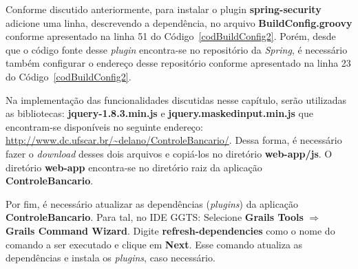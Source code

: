Conforme discutido  anteriormente, para instalar o  plugin {\bf spring-security}
adicione   uma    linha,   descrevendo   a   dependência,    no   arquivo   {\bf
  BuildConfig.groovy}     conforme     apresentado     na    linha     51     do
Código~\ref{codBuildConfig2}.   Porém,  desde  que  o código  fonte  desse  {\it
  plugin}  encontra-se  no repositório  da  {\it  Spring},  é necessário  também
configurar  o endereço  desse repositório  conforme apresentado  na linha  23 do
Código~\ref{codBuildConfig2}.  

\vspace{0.5cm}

   Na implementação das
funcionalidades discutidas nesse capítulo, serão utilizadas as bibliotecas: {\bf
  jquery-1.8.3.min.js}   e  {\bf  jquery.maskedinput.min.js}   que  encontram-se
disponíveis                 no                 seguinte                endereço:
{\footnotesize\url{http://www.dc.ufscar.br/~delano/ControleBancario/}}.     Dessa
forma, é necessário  fazer o {\it download} desses dois  arquivos e copiá-los no
diretório {\bf web-app/js}.  O  diretório {\bf web-app} encontra-se no diretório
raiz da aplicação {\bf ControleBancario}. 

\vspace{0.5cm}

   Por  fim,  é  necessário
atualizar as  dependências ({\it plugins}) da  aplicação {\bf ControleBancario}.
Para  tal, no  IDE GGTS:  Selecione  {\bf Grails  Tools} $\Longrightarrow$  {\bf
  Grails  Command Wizard}.   Digite {\bf  refresh-dependencies} como  o  nome do
comando  a ser  executado e  clique  em {\bf  Next}.  Esse  comando atualiza  as
dependências    e     instala    os    {\it     plugins},    caso    necessário.


